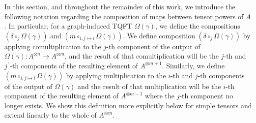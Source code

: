 \documentclass{amsart}
\newcommand{\tensor}{\otimes}
\newcommand{\Atn}{A^{\tensor n}}
\newcommand{\Atm}{A^{\tensor m}}
\newcommand{\pri}{^{\,\prime}}
\theoremstyle{definition}
\begin{document}
In this section, and throughout the remainder of this work, we introduce the following notation regarding the composition of maps between tensor powers of $A$. In particular, for a graph-induced TQFT $\Omega(\gamma)$, we define the compositions $(\delta \circ_{j} \Omega(\gamma))$ and $(m \circ_{i,j\mapsto i}\Omega(\gamma))$. We define composition $(\delta \circ_{j} \Omega(\gamma))$ by applying comultiplication to the $j$-th component of the output of $\Omega(\gamma):\Atn\longrightarrow\Atm$, and the result of that comultiplication will be the $j$-th and $j\pri$-th components of the resulting element of $A^{\tensor m+1}$. Similarly, we define $(m\circ_{i,j\mapsto i}\Omega(\gamma))$ by applying multiplication to the $i$-th and $j$-th components of the output of $\Omega(\gamma)$ and the result of that multiplication will be the $i$-th component of the resulting element of $A^{\tensor m-1}$ where the $j$-th component no longer exists. We show this definition more explicitly below for simple tensors and extend linearly to the whole of $\Atm$.
\end{document}
